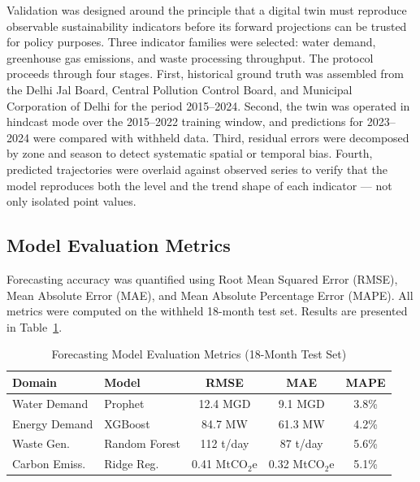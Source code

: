 \documentclass[conference]{IEEEtran}
\begin{document}
Validation was designed around the principle that a digital twin must
reproduce observable sustainability indicators before its forward
projections can be trusted for policy purposes. Three indicator families
were selected: water demand, greenhouse gas emissions, and waste
processing throughput. The protocol proceeds through four stages.
First, historical ground truth was assembled from the Delhi Jal Board,
Central Pollution Control Board, and Municipal Corporation of Delhi for
the period 2015--2024. Second, the twin was operated in hindcast mode
over the 2015--2022 training window, and predictions for 2023--2024 were
compared with withheld data. Third, residual errors were decomposed by
zone and season to detect systematic spatial or temporal bias. Fourth,
predicted trajectories were overlaid against observed series to verify
that the model reproduces both the level and the trend shape of each
indicator --- not only isolated point values.

\subsection{Model Evaluation Metrics}
\label{subsec:metrics}

Forecasting accuracy was quantified using Root Mean Squared Error
(RMSE), Mean Absolute Error (MAE), and Mean Absolute Percentage Error
(MAPE). All metrics were computed on the withheld 18-month test set.
Results are presented in Table~\ref{tab:metrics}.

\begin{table}[htbp]
\caption{Forecasting Model Evaluation Metrics (18-Month Test Set)}
\label{tab:metrics}
\begin{center}
\begin{tabular}{|l|l|c|c|c|}
\hline
\textbf{Domain} & \textbf{Model} & \textbf{RMSE} & \textbf{MAE} &
\textbf{MAPE} \\
\hline
Water Demand   & Prophet         & 12.4 MGD          & 9.1 MGD         & 3.8\% \\
Energy Demand  & XGBoost         & 84.7 MW            & 61.3 MW         & 4.2\% \\
Waste Gen.     & Random Forest   & 112 t/day          & 87 t/day        & 5.6\% \\
Carbon Emiss.  & Ridge Reg.      & 0.41 MtCO$_2$e    & 0.32 MtCO$_2$e & 5.1\% \\
\hline
\end{tabular}
\end{center}
\end{table}
\end{document}
